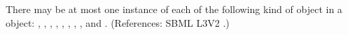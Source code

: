 There may be at most one instance of each of the following kind of object
in a \Model object: {\ListOfFunctionDefinitions,
\ListOfUnitDefinitions, \ListOfCompartments, \ListOfSpecies,
\ListOfParameters, \ListOfInitialAssignments, \ListOfRules,
\ListOfConstraints, \ListOfReactions} and
{\ListOfEvents}. (References: SBML L3V2
.)
